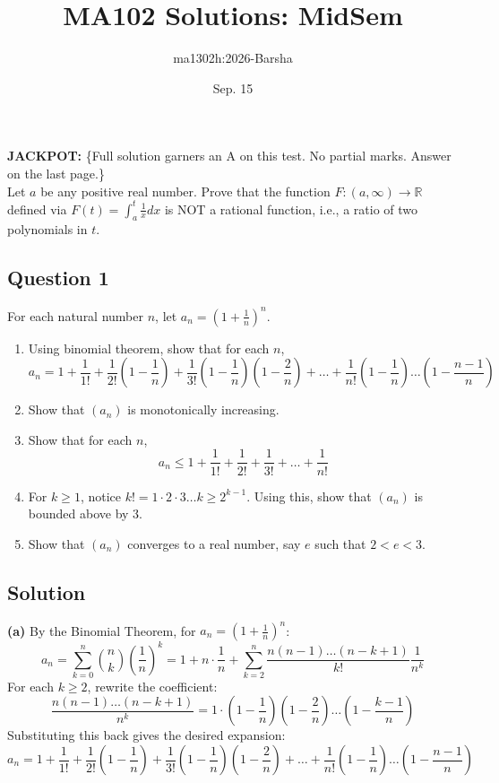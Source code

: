 \documentclass[12pt]{article}
\title{MA102 Solutions: MidSem}
\author{ma1302h:2026-Barsha}
\date{Sep. 15}
\begin{document}
\maketitle

\noindent\textbf{JACKPOT:} \{Full solution garners an A on this test. No partial marks. Answer on the last page.\}\\
Let $a$ be any positive real number. Prove that the function $F : (a, \infty) \to \mathbb{R}$ defined via $F(t) = \int_a^t \frac{1}{x} dx$ is NOT a rational function, i.e., a ratio of two polynomials in $t$.

\subsection*{Question 1}
For each natural number $n$, let $a_n = \left(1 + \frac{1}{n}\right)^n$.

\begin{enumerate}
    \item[(a)] Using binomial theorem, show that for each $n$,
    \[
    a_n = 1 + \frac{1}{1!} + \frac{1}{2!} \left(1 - \frac{1}{n}\right) + \frac{1}{3!} \left(1 - \frac{1}{n}\right)\left(1 - \frac{2}{n}\right) + \dots + \frac{1}{n!} \left(1 - \frac{1}{n}\right)\dots\left(1 - \frac{n-1}{n}\right)
    \]
    \item[(b)] Show that $(a_n)$ is monotonically increasing.
    \item[(c)] Show that for each $n$,
    \[
    a_n \le 1 + \frac{1}{1!} + \frac{1}{2!} + \frac{1}{3!} + \dots + \frac{1}{n!}
    \]
    \item[(d)] For $k \ge 1$, notice $k! = 1 \cdot 2 \cdot 3 \dots k \ge 2^{k-1}$. Using this, show that $(a_n)$ is bounded above by 3.
    \item[(e)] Show that $(a_n)$ converges to a real number, say $e$ such that $2 < e < 3$.
\end{enumerate}

\subsection*{Solution}

\textbf{(a)} By the Binomial Theorem, for $a_n = \left(1 + \frac{1}{n}\right)^n$:
\[
a_n = \sum_{k=0}^n \binom{n}{k} \left(\frac{1}{n}\right)^k = 1 + n \cdot \frac{1}{n} + \sum_{k=2}^n \frac{n(n-1)\dots(n-k+1)}{k!} \frac{1}{n^k}
\]
For each $k \ge 2$, rewrite the coefficient:
\[
\frac{n(n-1)\dots(n-k+1)}{n^k} = 1 \cdot \left(1 - \frac{1}{n}\right)\left(1 - \frac{2}{n}\right)\dots\left(1 - \frac{k-1}{n}\right)
\]
Substituting this back gives the desired expansion:
\[
a_n = 1 + \frac{1}{1!} + \frac{1}{2!} \left(1 - \frac{1}{n}\right) + \frac{1}{3!} \left(1 - \frac{1}{n}\right)\left(1 - \frac{2}{n}\right) + \dots + \frac{1}{n!} \left(1 - \frac{1}{n}\right)\dots\left(1 - \frac{n-1}{n}\right)
\]
\end{document}
